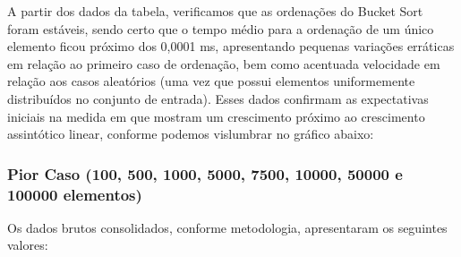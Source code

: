 \documentclass[a4paper, 12pt]{article}
\begin{document}
A partir dos dados da tabela, verificamos que as ordenações do Bucket Sort foram estáveis, sendo certo que o tempo médio para a ordenação de um único elemento ficou próximo dos 0,0001 ms, apresentando pequenas variações erráticas em relação ao primeiro caso de ordenação, bem como acentuada velocidade em relação aos casos aleatórios (uma vez que possui elementos uniformemente distribuídos no conjunto de entrada). Esses dados confirmam as expectativas iniciais na medida em que mostram um crescimento próximo ao crescimento assintótico linear, conforme podemos vislumbrar no gráfico abaixo:

\vspace{0.3cm}
\begin{center}
\end{center}

\subsubsection{Pior Caso (100, 500, 1000, 5000, 7500, 10000, 50000 e 100000 elementos)}

\tab{ }Os dados brutos consolidados, conforme metodologia, apresentaram os seguintes valores:
\vspace{0.3cm}
\end{document}
